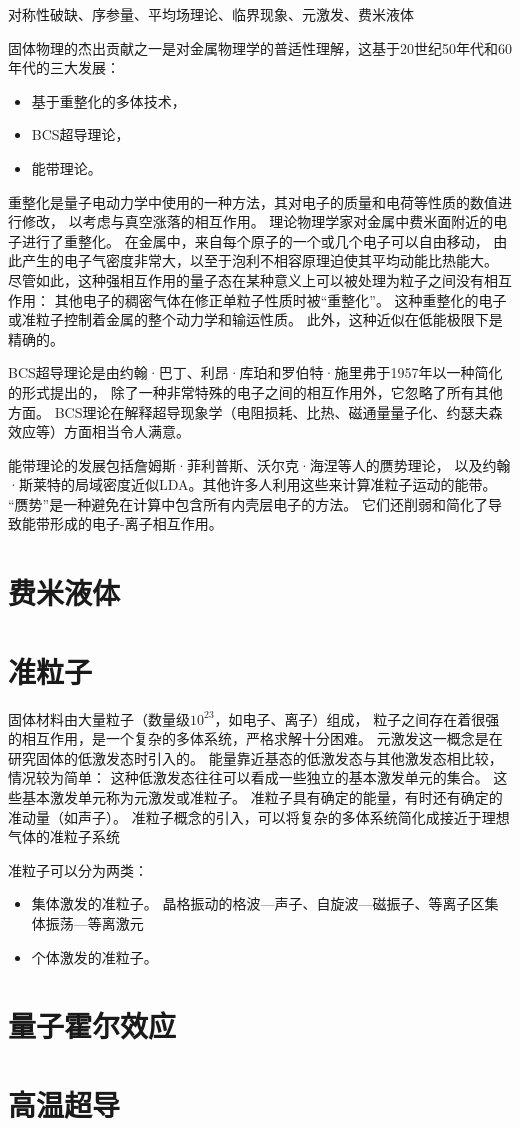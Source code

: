 \documentclass{article}
\begin{document}
对称性破缺、序参量、平均场理论、临界现象、元激发、费米液体

固体物理的杰出贡献之一是对金属物理学的普适性理解，这基于20世纪50年代和60年代的三大发展：
\begin{itemize}
    \item 基于重整化的多体技术，
    \item BCS超导理论，
    \item 能带理论。
\end{itemize}

重整化是量子电动力学中使用的一种方法，其对电子的质量和电荷等性质的数值进行修改，
以考虑与真空涨落的相互作用。
理论物理学家对金属中费米面附近的电子进行了重整化。
在金属中，来自每个原子的一个或几个电子可以自由移动，
由此产生的电子气密度非常大，以至于泡利不相容原理迫使其平均动能比热能大。
尽管如此，这种强相互作用的量子态在某种意义上可以被处理为粒子之间没有相互作用：
其他电子的稠密气体在修正单粒子性质时被“重整化”。
这种重整化的电子或准粒子控制着金属的整个动力学和输运性质。
此外，这种近似在低能极限下是精确的。

BCS超导理论是由约翰·巴丁、利昂·库珀和罗伯特·施里弗于1957年以一种简化的形式提出的，
除了一种非常特殊的电子之间的相互作用外，它忽略了所有其他方面。
BCS理论在解释超导现象学（电阻损耗、比热、磁通量量子化、约瑟夫森效应等）方面相当令人满意。

能带理论的发展包括詹姆斯·菲利普斯、沃尔克·海涅等人的赝势理论，
以及约翰·斯莱特的局域密度近似LDA。其他许多人利用这些来计算准粒子运动的能带。
“赝势”是一种避免在计算中包含所有内壳层电子的方法。
它们还削弱和简化了导致能带形成的电子-离子相互作用。 


\section{费米液体}

\section{准粒子}
固体材料由大量粒子（数量级$10^{23}$，如电子、离子）组成，
粒子之间存在着很强的相互作用，是一个复杂的多体系统，严格求解十分困难。
元激发这一概念是在研究固体的低激发态时引入的。
能量靠近基态的低激发态与其他激发态相比较，情况较为简单：
这种低激发态往往可以看成一些独立的基本激发单元的集合。
这些基本激发单元称为元激发或准粒子。
准粒子具有确定的能量，有时还有确定的准动量（如声子）。
准粒子概念的引入，可以将复杂的多体系统简化成接近于理想气体的准粒子系统

准粒子可以分为两类：
\begin{itemize}
    \item 集体激发的准粒子。
    晶格振动的格波---声子、自旋波---磁振子、等离子区集体振荡---等离激元
    \item 个体激发的准粒子。
\end{itemize}


\section{量子霍尔效应}

\section{高温超导}
\end{document}
